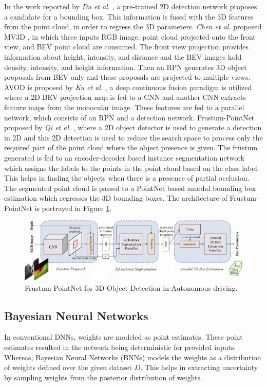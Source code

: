 \documentclass[10pt,twocolumn,letterpaper]{article}
\begin{document}
In the work reported by \textit{Du et al.} \cite{Du2018}, a pre-trained 2D detection network proposes a candidate for a bounding box. This information is fused with the 3D features from the point cloud, in order to regress the 3D parameters. \textit{Chen et al.} proposed MV3D \cite{MV3D2017}, in which three inputs RGB image, point cloud projected onto the front view, and BEV point cloud are consumed. The front view projection provides information about height, intensity, and distance and the BEV images hold density, intensity, and height information. Then an RPN generates 3D object proposals from BEV only and these proposals are projected to multiple views. AVOD is proposed by \textit{Ku et al.} \cite{AVOD2018}, a deep continuous fusion paradigm is utilized where a 2D BEV projection map is fed to a CNN and another CNN extracts feature maps from the monocular image. These features are fed to a parallel network, which consists of an RPN and a detection network. Frustum-PointNet proposed by \textit{Qi et al.} \cite{FPointnet2018}, where a 2D object detector is used to generate a detection in 2D and this 2D detection is used to reduce the search space to process only the required part of the point cloud where the object presence is given. The frustum generated is fed to an encoder-decoder based instance segmentation network which assigns the labels to the points in the point cloud based on the class label. This helps in finding the objects when there is a presence of partial occlusion. The segmented point cloud is passed to a PointNet \cite{Pointnet2017} based amodal bounding box estimation which regresses the 3D bounding boxes. The architecture of Frustum-PointNet \cite{FPointnet2018} is portrayed in Figure \ref{fig:frustumpointnet}.

\begin{figure}
	\centering
	\includegraphics[scale = 0.335]{images/Frustum_PointNet.png}
	\caption{Frustum PointNet for 3D Object Detection in Autonomous driving.}
	\label{fig:frustumpointnet}
\end{figure}

\subsection{Bayesian Neural Networks}
In conventional DNNs, weights are modeled as point estimates. These point estimates resulted in the network being deterministic for provided inputs. Whereas, Bayesian Neural Networks (BNNs) models the weights as a distribution of weights defined over the given dataset $D$. This helps in extracting uncertainty by sampling weights from the posterior distribution of weights.
\end{document}
